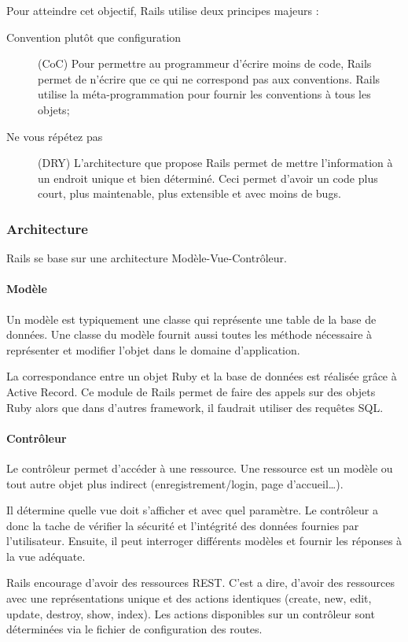 Pour atteindre cet objectif, Rails utilise deux principes majeurs :
\begin{description}
  \item[Convention plutôt que configuration] (CoC) Pour permettre au programmeur d'écrire moins de code, Rails permet de n'écrire que ce qui ne correspond pas aux conventions. Rails utilise la méta-programmation pour fournir les conventions à tous les objets;
  \item[Ne vous répétez  pas] (DRY) L'architecture que propose Rails permet de mettre l'information à un endroit unique et bien déterminé. Ceci permet d'avoir un code plus court, plus maintenable, plus extensible et avec moins de bugs.
\end{description}

\subsubsection{Architecture}
Rails se base sur une architecture Modèle-Vue-Contrôleur.
\paragraph{Modèle} 
Un modèle est typiquement une classe qui représente une table de la base de données. Une classe du modèle fournit aussi toutes les méthode nécessaire à représenter et modifier l'objet dans le domaine d'application.

La correspondance entre un objet Ruby et la base de données est réalisée grâce à Active Record. Ce module de Rails permet de faire des appels sur des objets Ruby alors que dans d'autres framework, il faudrait utiliser des requêtes SQL.
  
\paragraph{Contrôleur} 
Le contrôleur permet d'accéder à une ressource. Une ressource est un modèle ou tout autre objet plus indirect (enregistrement/login, page d'accueil\ldots).  

Il détermine quelle vue doit s'afficher et avec quel paramètre. Le contrôleur a donc la tache de vérifier la sécurité et l'intégrité des données fournies par l'utilisateur. Ensuite, il peut interroger différents modèles et fournir les réponses à la vue adéquate. 

Rails encourage d'avoir des ressources REST. C'est a dire, d'avoir des ressources avec une représentations unique et des actions identiques (create, new, edit, update, destroy, show, index). Les actions disponibles sur un contrôleur sont déterminées via le fichier de configuration des routes.

